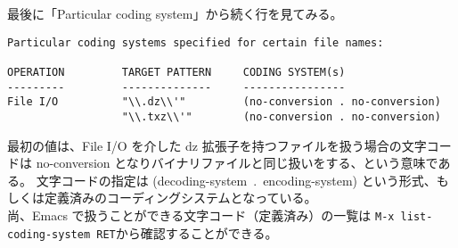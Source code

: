 最後に「Particular coding system」から続く行を見てみる。
\begin{mdframed}[roundcorner=0.50zw,leftmargin=3.00zw,rightmargin=3.00zw,skipabove=0.40zw,skipbelow=0.40zw,innertopmargin=4.00pt,innerbottommargin=4.00pt,innerleftmargin=5.00pt,innerrightmargin=5.00pt,linecolor=gray!090,linewidth=0.50pt,backgroundcolor=gray!90]\color{gray!10}
\begin{verbatim}
Particular coding systems specified for certain file names:

OPERATION         TARGET PATTERN     CODING SYSTEM(s)
---------         --------------     ----------------
File I/O          "\\.dz\\'"         (no-conversion . no-conversion)
                  "\\.txz\\'"        (no-conversion . no-conversion)
\end{verbatim}
\end{mdframed}
最初の値は、File I/O を介した dz 拡張子を持つファイルを扱う場合の文字コードは no-conversion となりバイナリファイルと同じ扱いをする、という意味である。
文字コードの指定は (decoding-system~.~encoding-system) という形式、もしくは定義済みのコーディングシステムとなっている。\\

尚、Emacs で扱うことができる文字コード（定義済み）の一覧は \texttt{M-x list-coding-system RET}から確認することができる。
